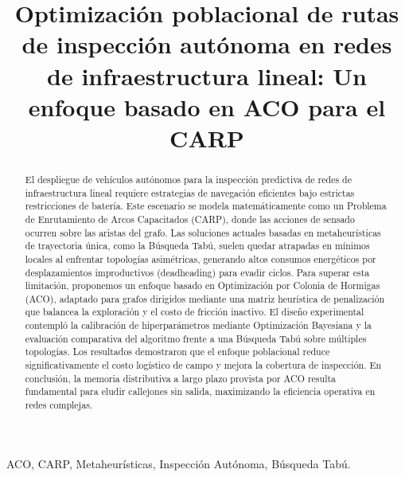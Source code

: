 \documentclass[conference]{IEEEtran}
\begin{document}
\title{Optimización poblacional de rutas de inspección autónoma en redes de infraestructura lineal: Un enfoque basado en ACO para el CARP\\}

\author{
\and
{}
}

\maketitle

\begin{abstract}
El despliegue de vehículos autónomos para la inspección predictiva de redes de infraestructura lineal requiere estrategias de navegación eficientes bajo estrictas restricciones de batería. Este escenario se modela matemáticamente como un Problema de Enrutamiento de Arcos Capacitados (CARP), donde las acciones de sensado ocurren sobre las aristas del grafo. Las soluciones actuales basadas en metaheurísticas de trayectoria única, como la Búsqueda Tabú, suelen quedar atrapadas en mínimos locales al enfrentar topologías asimétricas, generando altos consumos energéticos por desplazamientos improductivos (deadheading) para evadir ciclos. Para superar esta limitación, proponemos un enfoque basado en Optimización por Colonia de Hormigas (ACO), adaptado para grafos dirigidos mediante una matriz heurística de penalización que balancea la exploración y el costo de fricción inactivo. El diseño experimental contempló la calibración de hiperparámetros mediante Optimización Bayesiana y la evaluación comparativa del algoritmo frente a una Búsqueda Tabú sobre múltiples topologías. Los resultados demostraron que el enfoque poblacional reduce significativamente el costo logístico de campo y mejora la cobertura de inspección. En conclusión, la memoria distributiva a largo plazo provista por ACO resulta fundamental para eludir callejones sin salida, maximizando la eficiencia operativa en redes complejas.
\end{abstract}

\begin{IEEEkeywords}
ACO, CARP, Metaheurísticas, Inspección Autónoma, Búsqueda Tabú.
\end{IEEEkeywords}
\end{document}
